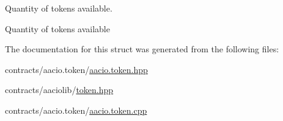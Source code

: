 Quantity of tokens available. 

Quantity of tokens available 

The documentation for this struct was generated from the following files\+:\begin{DoxyCompactItemize}
\item 
contracts/aacio.\+token/\mbox{\hyperlink{aacio_8token_8hpp}{aacio.\+token.\+hpp}}\item 
contracts/aaciolib/\mbox{\hyperlink{token_8hpp}{token.\+hpp}}\item 
contracts/aacio.\+token/\mbox{\hyperlink{aacio_8token_8cpp}{aacio.\+token.\+cpp}}\end{DoxyCompactItemize}
